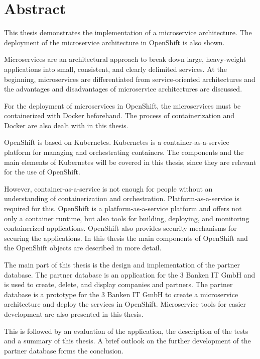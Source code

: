 \chapter{Abstract}
This thesis demonstrates the implementation of a microservice architecture. The deployment of the microservice architecture in OpenShift is also shown.

Microservices are an architectural approach to break down large, heavy-weight applications into small, consistent, and clearly delimited services. At the beginning, microservices are differentiated from service-oriented architectures and the advantages and disadvantages of microservice architectures are discussed.

For the deployment of microservices in OpenShift, the microservices must be containerized with Docker beforehand. The process of containerization and Docker are also dealt with in this thesis.

OpenShift is based on Kubernetes. Kubernetes is a container-as-a-service platform for managing and orchestrating containers. The components and the main elements of Kubernetes will be covered in this thesis, since they are relevant for the use of OpenShift.

However, container-as-a-service is not enough for people without an understanding of containerization and orchestration. Platform-as-a-service is required for this. OpenShift is a platform-as-a-service platform and offers not only a container runtime, but also tools for building, deploying, and monitoring containerized applications. OpenShift also provides security mechanisms for securing the applications. In this thesis the main components of OpenShift and the OpenShift objects are described in more detail.

The main part of this thesis is the design and implementation of the partner database. The partner database is an application for the 3 Banken IT GmbH and is used to create, delete, and display companies and partners. The partner database is a prototype for the 3 Banken IT GmbH to create a microservice architecture and deploy the services in OpenShift. Microservice tools for easier development are also presented in this thesis.

This is followed by an evaluation of the application, the description of the tests and a summary of this thesis. A brief outlook on the further development of the partner database forms the conclusion.
